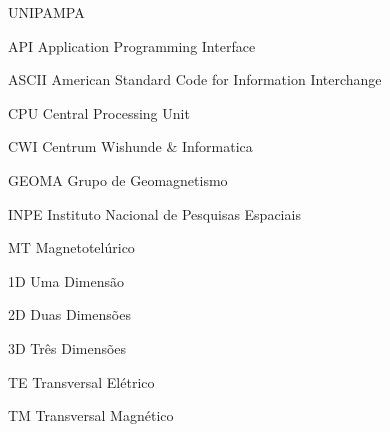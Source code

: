 \documentclass[csgeo,tcc]{unipampa}
\begin{document}
\begin{listofabbrv}{UNIPAMPA}
        
        \item[API]          {Application Programming Interface}
        \item[ASCII]        {American Standard Code for Information Interchange}
        \item[CPU]          {Central Processing Unit}
        \item[CWI]          {Centrum Wishunde \& Informatica}
        \item[GEOMA]        {Grupo de Geomagnetismo}
        \item[INPE]         {Instituto Nacional de Pesquisas Espaciais}
        \item[MT]           {Magnetotelúrico}
        \item[1D]                        Uma Dimensão
       \item[2D]                        Duas Dimensões
       \item[3D]                        Três Dimensões
       \item[TE]                        Transversal Elétrico
       \item[TM]                        Transversal Magnético
        
\end{listofabbrv}







\end{document}
